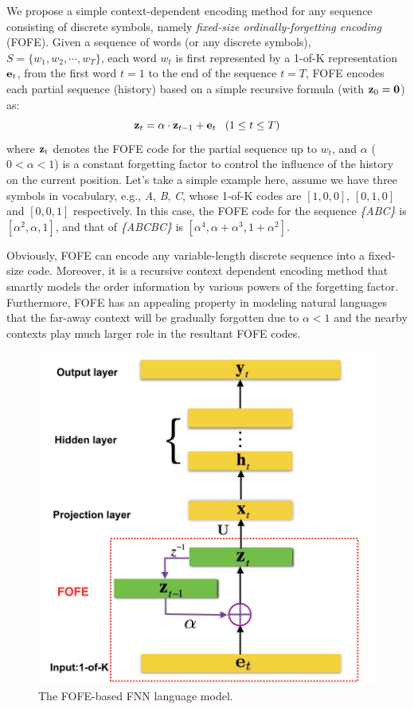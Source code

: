 \documentclass[11pt]{article}
\begin{document}
We propose a simple context-dependent encoding method for any sequence consisting of discrete symbols, namely {\em fixed-size ordinally-forgetting encoding} (FOFE). 
Given a sequence of words (or any discrete symbols), $S=\{ w_1, w_2, \cdots, w_T \}$, each word $w_t$ is first represented by a 1-of-K representation ${\bf e}_t$, from the first word $t=1$ to the end of the sequence $t=T$, FOFE encodes each partial sequence (history) based on a simple recursive formula (with $ {\bf z}_0 = {\bf 0}$) as:
\begin{equation}\label{eq-fofe-coding}
{\bf z}_t = \alpha \cdot {\bf z}_{t-1} + {\bf e}_{t}  \;\;\; (1 \leq t \leq T)
\end{equation}
where ${\bf z}_t$ denotes the FOFE code for the partial sequence up to $w_t$, and $\alpha$ ($0<\alpha<1$) is a constant forgetting factor to control the influence of the history on the current position. 
Let's take a simple example here, assume we have three symbols in vocabulary, e.g., {\em A}, {\em B}, {\em C}, whose 1-of-K codes are $[1,0,0]$, $[0,1,0]$ and $[0,0,1]$ respectively. In this case, the FOFE code for the sequence {\em \{ABC\}} is $[\alpha^2, \alpha ,1]$, and that of {\em \{ABCBC\}} is $[\alpha^4, \alpha+\alpha^3 ,1+\alpha^2]$.

Obviously, FOFE can encode any variable-length discrete sequence into a fixed-size code. Moreover, it is a recursive context dependent encoding method that smartly models the order information by various powers of the forgetting factor. Furthermore, FOFE has an appealing property in modeling natural languages that the far-away context will be gradually forgotten due to $\alpha<1$ and the nearby contexts play much larger role in the resultant FOFE codes.

\begin{figure}[t]
	\centering
	\includegraphics[width=0.8\linewidth]{FOFE_bigram.png}
	\caption{The FOFE-based FNN language model.}
	\label{fig:FOFE_bigram}
\end{figure}
\end{document}
